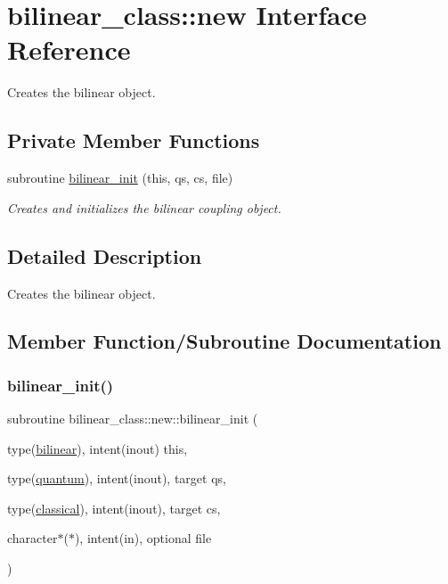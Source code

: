 \hypertarget{interfacebilinear__class_1_1new}{}\section{bilinear\+\_\+class\+:\+:new Interface Reference}
\label{interfacebilinear__class_1_1new}


Creates the bilinear object.  


\subsection*{Private Member Functions}
\begin{DoxyCompactItemize}
\item 
subroutine \hyperlink{interfacebilinear__class_1_1new_a860c1a5d7e94a09db9c487de818f39e7}{bilinear\+\_\+init} (this, qs, cs, file)
\begin{DoxyCompactList}\small\item\em Creates and initializes the bilinear coupling object. \end{DoxyCompactList}\end{DoxyCompactItemize}


\subsection{Detailed Description}
Creates the bilinear object. 

\subsection{Member Function/\+Subroutine Documentation}
\mbox{\label{interfacebilinear__class_1_1new_a860c1a5d7e94a09db9c487de818f39e7}} 
\subsubsection{\texorpdfstring{bilinear\+\_\+init()}{bilinear\_init()}}
{\footnotesize\ttfamily subroutine bilinear\+\_\+class\+::new\+::bilinear\+\_\+init (\begin{DoxyParamCaption}\item[{type(\hyperlink{structbilinear__class_1_1bilinear}{bilinear}), intent(inout)}]{this,  }\item[{type(\hyperlink{structquantum__class_1_1quantum}{quantum}), intent(inout), target}]{qs,  }\item[{type(\hyperlink{structclassical__class_1_1classical}{classical}), intent(inout), target}]{cs,  }\item[{character$\ast$($\ast$), intent(in), optional}]{file }\end{DoxyParamCaption})\hspace{0.3cm}{\ttfamily [private]}}



